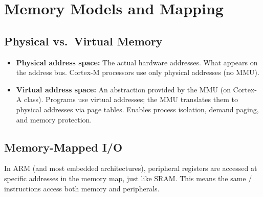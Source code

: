 \section{Memory Models and Mapping}
\label{sec:mem:mapping}

\subsection{Physical vs.\ Virtual Memory}

\begin{itemize}
  \item \textbf{Physical address space:} The actual hardware addresses. What appears on the address bus. Cortex-M processors use only physical addresses (no MMU).
  \item \textbf{Virtual address space:} An abstraction provided by the MMU (on Cortex-A class). Programs use virtual addresses; the MMU translates them to physical addresses via page tables. Enables process isolation, demand paging, and memory protection.
\end{itemize}

\subsection{Memory-Mapped I/O}

In ARM (and most embedded architectures), peripheral registers are accessed at specific addresses in the memory map, just like SRAM. This means the same / instructions access both memory and peripherals.

